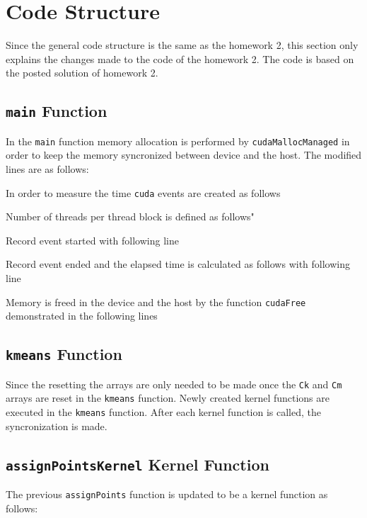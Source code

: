 \section{Code Structure}
Since the general code structure is the same as the homework 2, this section only explains the changes made to the code of the homework 2. The code is based on the posted solution of homework 2.

\subsection{\texttt{main} Function}
In the \texttt{main} function memory allocation is performed by \texttt{cudaMallocManaged} in order to keep the memory syncronized between device and the host. The modified lines are as follows:


In order to measure the time \texttt{cuda} events are created as follows


Number of threads per thread block is defined as follows"


Record event started with following line


Record event ended and the elapsed time is calculated as follows with following line


Memory is freed in the device and the host by the function \texttt{cudaFree} demonstrated in the following lines


\subsection{\texttt{kmeans} Function}
Since the resetting the arrays are only needed to be made once the \texttt{Ck} and \texttt{Cm} arrays are reset in the \texttt{kmeans} function. Newly created kernel functions are executed in the \texttt{kmeans} function. After each kernel function is called, the syncronization is made.


\subsection{\texttt{assignPointsKernel} Kernel Function}
The previous \texttt{assignPoints} function is updated to be a kernel function as follows:


